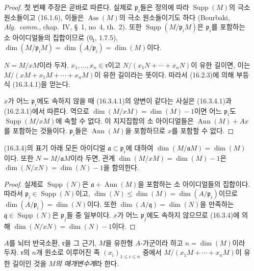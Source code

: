 \begin{proof}
첫 번째 주장은 곧바로 따른다. 실제로 $\mathfrak{p}_i$들은 정의에
따라 $\operatorname{Supp}(M)$의 극소 원소들이고 (16.1.6), 이들은
$\operatorname{Ass}(M)$의 극소 원소들이기도 하다 (Bourbaki,
\emph{Alg.~comm.}, chap.~IV, \S~1, no~4, th.~2). 또한
$\operatorname{Supp}(M/\mathfrak{p}_iM)$은
$\mathfrak{p}_i$를 포함하는 소 아이디얼들의 집합이므로
($0_{\mathrm I}$, 1.7.5),
$\dim(M/\mathfrak{p}_iM)=\dim(A/\mathfrak{p}_i)=\dim(M)$이다.

$N=M/xM$이라 두자. $x_1,\ldots,x_n\in\mathfrak{r}$이고
$N/(x_1N+\cdots+x_nN)$이 유한 길이면, 이는
$M/(xM+x_1M+\cdots+x_nM)$이 유한 길이라는 뜻이다. 따라서
(16.2.3)에 의해 부등식 (16.3.4.1)을 얻는다.

$x$가 어느 $\mathfrak{p}_i$에도 속하지 않을 때 (16.3.4.1)의
양변이 같다는 사실은 (16.3.4.1)과 (16.2.3.1)에서 따른다. 역으로
$\dim(M/xM)=\dim(M)-1$이면 어느 $\mathfrak{p}_i$도
$\operatorname{Supp}(M/xM)$에 속할 수 없다. 이 지지집합의 소
아이디얼들은 $\operatorname{Ann}(M)+Ax$를 포함하는 것들이다.
$\mathfrak{p}_i$들은 $\operatorname{Ann}(M)$을 포함하므로 $x$를
포함할 수 없다.
\end{proof}

\begin{corollary}[16.3.5]
\label{0.16.3.5-fr}
(16.3.4)의 표기 아래 모든 아이디얼
$\mathfrak{a}\subset\mathfrak{p}_i$에 대하여
$\dim(M/\mathfrak{a}M)=\dim(M)$이다. 또한
$N=M/\mathfrak{a}M$이라 두면, 관계
$\dim(M/xM)=\dim(M)-1$은
$\dim(N/xN)=\dim(N)-1$을 함의한다.
\end{corollary}

\begin{proof}
실제로 $\operatorname{Supp}(N)$은
$\mathfrak{a}+\operatorname{Ann}(M)$을 포함하는 소 아이디얼들의
집합이다. 따라서 $\mathfrak{p}_i\in\operatorname{Supp}(N)$이고,
$\dim(N)\leq\dim(M)=\dim(A/\mathfrak{p}_i)$이므로
$\dim(A/\mathfrak{p}_i)=\dim(N)$이다. 또한
$\dim(A/\mathfrak{q})=\dim(N)$을 만족하는
$\mathfrak{q}\in\operatorname{Supp}(N)$은 $\mathfrak{p}_j$들 중
일부이다. $x$가 어느 $\mathfrak{p}_j$에도 속하지 않으므로
(16.3.4)에 의해 $\dim(N/xN)=\dim(N)-1$이다.
\end{proof}

\begin{definition}[16.3.6]
\label{0.16.3.6-fr}
$A$를 뇌터 반국소환, $\mathfrak{r}$을 그 근기, $M$을 유한형
$A$-가군이라 하고 $n=\dim(M)$이라 두자. $\mathfrak{r}$의 $n$개
원소로 이루어진 족 $(x_i)_{1\leq i\leq n}$ 중에서
$M/(x_1M+\cdots+x_nM)$이 유한 길이인 것을 \emph{$M$의
매개변수계}라 한다.
\end{definition}

